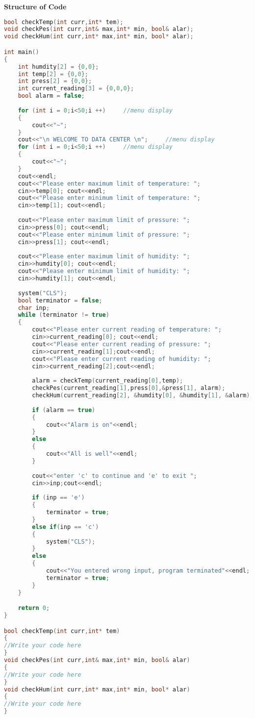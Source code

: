 \documentclass[11pt,fleqn]{book} %
\begin{document}
\hfill \break
\textbf{Structure of Code}
\begin{lstlisting}[language=C++, caption = Task]
bool checkTemp(int curr,int* tem);
void checkPes(int curr,int& max,int* min, bool& alar);
void checkHum(int curr,int* max,int* min, bool* alar);

int main()
{
	int humdity[2] = {0,0};
	int temp[2] = {0,0};
	int press[2] = {0,0};
	int current_reading[3] = {0,0,0};
	bool alarm = false;
	
	for (int i = 0;i<50;i ++)     //menu display
	{
		cout<<"~";
	}
	cout<<"\n WELCOME TO DATA CENTER \n";     //menu display
	for (int i = 0;i<50;i ++)     //menu display
	{
		cout<<"~";
	}
	cout<<endl;
	cout<<"Please enter maximum limit of temperature: ";
	cin>>temp[0]; cout<<endl;
	cout<<"Please enter minimum limit of temperature: ";
	cin>>temp[1]; cout<<endl;
	
	cout<<"Please enter maximum limit of pressure: ";
	cin>>press[0]; cout<<endl;
	cout<<"Please enter minimum limit of pressure: ";
	cin>>press[1]; cout<<endl;	
	
	cout<<"Please enter maximum limit of humidity: ";
	cin>>humdity[0]; cout<<endl;
	cout<<"Please enter minimum limit of humidity: ";
	cin>>humdity[1]; cout<<endl;
	
	system("CLS");
	bool terminator = false;
	char inp;
	while (terminator != true)
	{
		cout<<"Please enter current reading of temperature: ";
		cin>>current_reading[0]; cout<<endl;
		cout<<"Please enter current reading of pressure: ";
		cin>>current_reading[1];cout<<endl;
		cout<<"Please enter current reading of humidity: ";
		cin>>current_reading[2];cout<<endl;
		
		alarm = checkTemp(current_reading[0],temp);
		checkPes(current_reading[1],press[0],&press[1], alarm);
		checkHum(current_reading[2], &humdity[0], &humdity[1], &alarm);
		
		if (alarm == true)
		{
			cout<<"Alarm is on"<<endl;
		}
		else
		{
			cout<<"All is well"<<endl;
		}
		
		cout<<"enter 'c' to continue and 'e' to exit ";
		cin>>inp;cout<<endl;
		
		if (inp == 'e')
		{
			terminator = true;
		}
		else if(inp == 'c')
		{
			system("CLS");
		}
		else
		{
			cout<<"You entered wrong input, program terminated"<<endl;
			terminator = true;
		}
	}

	return 0;
}

bool checkTemp(int curr,int* tem)
{
//Write your code here
}
void checkPes(int curr,int& max,int* min, bool& alar)
{
//Write your code here
}
void checkHum(int curr,int* max,int* min, bool* alar)
{
//Write your code here
}

\end{lstlisting}
\end{document}

